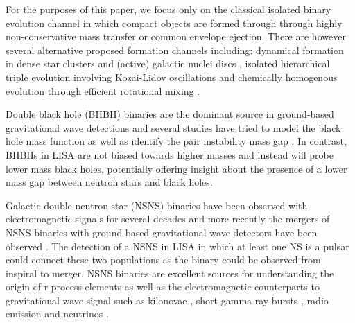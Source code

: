 For the purposes of this paper, we focus only on the classical isolated binary evolution channel \citep[e.g.][]{Tutukov+1973,Tutukov+1993,Kalogera+2007,Belczynski+2016} in which compact objects are formed through through highly non-conservative mass transfer or common envelope ejection. There are however several alternative proposed formation channels including: dynamical formation in dense star clusters \citep[e.g.][]{Sigurdsson+1993,PortegiesZwart+2000,Miller+2009,Rodriguez+2015} and (active) galactic nuclei discs \citep[e.g.][]{Morris+1993, Antonini+2016, McKernan+2020}, isolated hierarchical triple evolution involving Kozai-Lidov oscillations \citep[e.g.][]{Stephan+2016, Silsbee+2017,Antonini+2017} and chemically homogenous evolution through efficient rotational mixing \citep[e.g.][]{deMink+2009, deMink+2016,Marchant+2016}.

Double black hole (BHBH) binaries are the dominant source in ground-based gravitational wave detections and several studies have tried to model the black hole mass function as well as identify the pair instability mass gap \citep[e.g.][]{Baxter+2021}. In contrast, BHBHs in LISA are not biased towards higher masses and instead will probe lower mass black holes, potentially offering insight about the presence of a lower mass gap between neutron stars and black holes.

Galactic double neutron star (NSNS) binaries have been observed with electromagnetic signals for several decades \citep[e.g.][]{Hulse+1975} and more recently the mergers of NSNS binaries with ground-based gravitational wave detectors have been observed \citep[e.g.][]{Abbott+2017_NSNS}. The detection of a NSNS in LISA in which at least one NS is a pulsar could connect these two populations as the binary could be observed from inspiral to merger. NSNS binaries are excellent sources for understanding the origin of r-process elements \citep[e.g.][]{Eichler+1989} as well as the electromagnetic counterparts to gravitational wave signal such as kilonovae \citep[e.g.][]{Metzger+2017}, short gamma-ray bursts \citep[e.g.][]{Gompertz+2020}, radio emission \citep[e.g.][]{Hotokezaka+2016} and neutrinos \citep[e.g.][]{Kyutoku+2018}.

